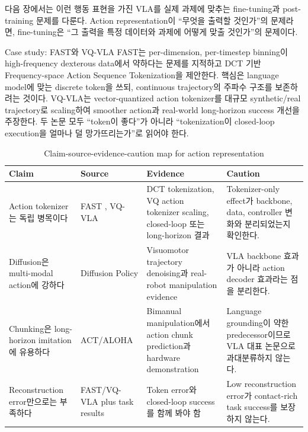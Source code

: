 다음 장에서는 이런 행동 표현을 가진 VLA를 실제 과제에 맞추는 fine-tuning과 post-training 문제를 다룬다. Action representation이 ``무엇을 출력할 것인가''의 문제라면, fine-tuning은 ``그 출력을 특정 데이터와 과제에 어떻게 맞출 것인가''의 문제이다.

\begin{casebox}{Case study: FAST와 VQ-VLA}
FAST는 per-dimension, per-timestep binning이 high-frequency dexterous data에서 약하다는 문제를 지적하고 DCT 기반 Frequency-space Action Sequence Tokenization을 제안한다. 핵심은 language model에 맞는 discrete token을 쓰되, continuous trajectory의 주파수 구조를 보존하려는 것이다. VQ-VLA는 vector-quantized action tokenizer를 대규모 synthetic/real trajectory로 scaling하여 smoother action과 real-world long-horizon success 개선을 주장한다. 두 논문 모두 ``token이 좋다''가 아니라 ``tokenization이 closed-loop execution을 얼마나 덜 망가뜨리는가''로 읽어야 한다.
\end{casebox}

\begin{table}[t]
  \centering
  \small
  \caption{Claim-source-evidence-caution map for action representation}
  \label{tab:ch4_claim_source}
  \begin{tabularx}{\textwidth}{L{31mm}L{28mm}L{48mm}Y}
    \toprule
    Claim & Source & Evidence & Caution \\
    \midrule
    Action tokenizer는 독립 병목이다 & FAST \citep{fast}, VQ-VLA \citep{vqvla} & DCT tokenization, VQ action tokenizer scaling, closed-loop 또는 long-horizon 결과 & Tokenizer-only effect가 backbone, data, controller 변화와 분리되었는지 확인한다. \\
    Diffusion은 multi-modal action에 강하다 & Diffusion Policy \citep{diffusionpolicy} & Visuomotor trajectory denoising과 real-robot manipulation evidence & VLA backbone 효과가 아니라 action decoder 효과라는 점을 분리한다. \\
    Chunking은 long-horizon imitation에 유용하다 & ACT/ALOHA \citep{aloha} & Bimanual manipulation에서 action chunk prediction과 hardware demonstration & Language grounding이 약한 predecessor이므로 VLA 대표 논문으로 과대분류하지 않는다. \\
    Reconstruction error만으로는 부족하다 & FAST/VQ-VLA plus task results & Token error와 closed-loop success를 함께 봐야 함 & Low reconstruction error가 contact-rich task success를 보장하지 않는다. \\
    \bottomrule
  \end{tabularx}
\end{table}

